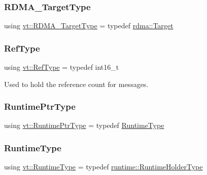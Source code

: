 \subsubsection{\texorpdfstring{R\+D\+M\+A\+\_\+\+Target\+Type}{RDMA\_TargetType}}
{\footnotesize\ttfamily using \hyperlink{namespacevt_a9bf03a57102d0274cc229b9ef94bb59e}{vt\+::\+R\+D\+M\+A\+\_\+\+Target\+Type} = typedef \hyperlink{structvt_1_1rdma_1_1_target}{rdma\+::\+Target}}

\mbox{\label{namespacevt_a9b39ce9494bb04674d0d5b895a5aa50f}} 
\subsubsection{\texorpdfstring{Ref\+Type}{RefType}}
{\footnotesize\ttfamily using \hyperlink{namespacevt_a9b39ce9494bb04674d0d5b895a5aa50f}{vt\+::\+Ref\+Type} = typedef int16\+\_\+t}



Used to hold the reference count for messages. 

\mbox{\label{namespacevt_a0ce60e0299d8fa32223b3b9ffa0af466}} 
\subsubsection{\texorpdfstring{Runtime\+Ptr\+Type}{RuntimePtrType}}
{\footnotesize\ttfamily using \hyperlink{namespacevt_a0ce60e0299d8fa32223b3b9ffa0af466}{vt\+::\+Runtime\+Ptr\+Type} = typedef \hyperlink{namespacevt_a5c1db2c048b259a2ba8961766ddb9278}{Runtime\+Type}}

\mbox{\label{namespacevt_a5c1db2c048b259a2ba8961766ddb9278}} 
\subsubsection{\texorpdfstring{Runtime\+Type}{RuntimeType}}
{\footnotesize\ttfamily using \hyperlink{namespacevt_a5c1db2c048b259a2ba8961766ddb9278}{vt\+::\+Runtime\+Type} = typedef \hyperlink{namespacevt_1_1runtime_ab09d044cce417fbcdb7e1e29b7aabbc3}{runtime\+::\+Runtime\+Holder\+Type}}

\mbox{\label{namespacevt_a8019b70cc4b9b0833c38559c85dfd53b}} 
